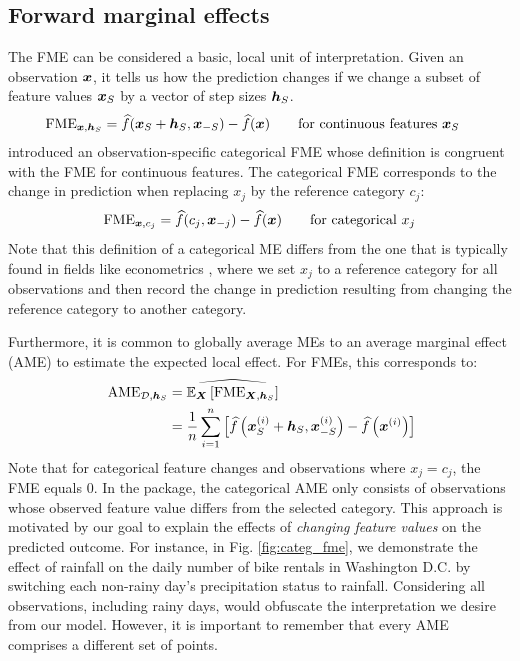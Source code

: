 \subsection{Forward marginal effects}
\label{sec:forward_marginal_effects}

The FME can be considered a basic, local unit of interpretation. Given an observation $\bm{x}$, it tells us how the prediction changes if we change a subset of feature values $\bm{x}_{S}$ by a vector of step sizes $\bm{h}_{S}$.
\begin{align*}
\text{FME}_{\bm{x}, \bm{h}_{S}} &= \widehat{f}(\bm{x}_{S} + \bm{h}_{S}, \bm{x}_{-S}) - \widehat{f}(\bm{x}) \quad \quad \text{for continuous features $\bm{x}_{S}$}
\end{align*}
\citet{scholbeck_fme} introduced an observation-specific categorical FME whose definition is congruent with the FME for continuous features. The categorical FME corresponds to the change in prediction when replacing $x_j$ by the reference category $c_j$:
\begin{equation*}
\text{FME}_{\bm{x}, c_j} = \widehat{f}(c_j, \bm{x}_{-j}) - \widehat{f}(\bm{x}) \quad \quad \text{for categorical $x_j$}
\end{equation*}
Note that this definition of a categorical ME differs from the one that is typically found in fields like econometrics \citep{williams_margins}, where we set $x_j$ to a reference category for all observations and then record the change in prediction resulting from changing the reference category to another category.
\par
Furthermore, it is common to globally average MEs to an average marginal effect (AME) to estimate the expected local effect. For FMEs, this corresponds to:
\begin{align}
        \;\text{AME}_{\mathcal{D}, \bm{h}_{S}} &= \widehat{\mathbb{E}_{\bm{X}} \left[\text{FME}_{\bm{X}, \bm{h}_{S}} \right]} \nonumber \\
        &= \frac{1}{n} \sum_{i = 1}^n \left[\widehat{f}\left(\bm{x}_{S}^{(i)} + \bm{h}_{S}, \bm{x}_{-S}^{(i)}\right) - \widehat{f}\left(\bm{x}^{(i)}\right) \right]
        \label{eq:ame}
\end{align}
Note that for categorical feature changes and observations where $x_j = c_j$, the FME equals 0. In the  package, the categorical AME only consists of observations whose observed feature value differs from the selected category. This approach is motivated by our goal to explain the effects of \textit{changing feature values} on the predicted outcome. For instance, in Fig. \ref{fig:categ_fme}, we demonstrate the effect of rainfall on the daily number of bike rentals in Washington D.C. by switching each non-rainy day's precipitation status to rainfall. Considering all observations, including rainy days, would obfuscate the interpretation we desire from our model. However, it is important to remember that every AME comprises a different set of points.



